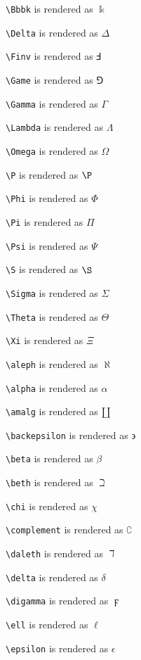 \texttt{\textbackslash Bbbk} is rendered as $\Bbbk$


\texttt{\textbackslash Delta} is rendered as $\Delta$


\texttt{\textbackslash Finv} is rendered as $\Finv$


\texttt{\textbackslash Game} is rendered as $\Game$


\texttt{\textbackslash Gamma} is rendered as $\Gamma$


\texttt{\textbackslash Lambda} is rendered as $\Lambda$


\texttt{\textbackslash Omega} is rendered as $\Omega$


\texttt{\textbackslash P} is rendered as $\P$


\texttt{\textbackslash Phi} is rendered as $\Phi$


\texttt{\textbackslash Pi} is rendered as $\Pi$


\texttt{\textbackslash Psi} is rendered as $\Psi$


\texttt{\textbackslash S} is rendered as $\S$


\texttt{\textbackslash Sigma} is rendered as $\Sigma$


\texttt{\textbackslash Theta} is rendered as $\Theta$


\texttt{\textbackslash Xi} is rendered as $\Xi$


\texttt{\textbackslash aleph} is rendered as $\aleph$


\texttt{\textbackslash alpha} is rendered as $\alpha$


\texttt{\textbackslash amalg} is rendered as $\amalg$


\texttt{\textbackslash backepsilon} is rendered as $\backepsilon$


\texttt{\textbackslash beta} is rendered as $\beta$


\texttt{\textbackslash beth} is rendered as $\beth$


\texttt{\textbackslash chi} is rendered as $\chi$


\texttt{\textbackslash complement} is rendered as $\complement$


\texttt{\textbackslash daleth} is rendered as $\daleth$


\texttt{\textbackslash delta} is rendered as $\delta$


\texttt{\textbackslash digamma} is rendered as $\digamma$


\texttt{\textbackslash ell} is rendered as $\ell$


\texttt{\textbackslash epsilon} is rendered as $\epsilon$


